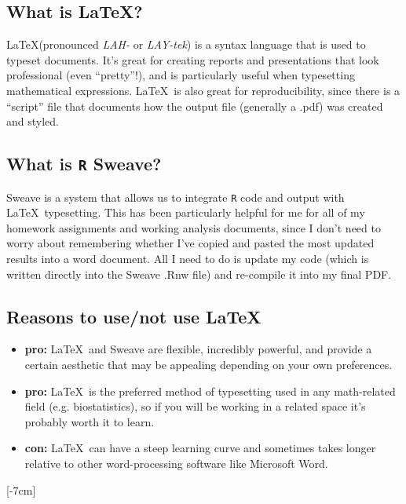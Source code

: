 \documentclass[11pt]{article}\usepackage[]{graphicx}\usepackage[]{color}
\begin{document}
\subsection{What is \LaTeX?}

\LaTeX (pronounced \textit{LAH-} or \textit{LAY-tek}) is a syntax language that is used to typeset documents. It's great for creating reports and presentations that look professional (even ``pretty''!), and is particularly useful when typesetting mathematical expressions. \LaTeX\ is also great for reproducibility, since there is a ``script'' file that documents how the output file (generally a .pdf) was created and styled. 

\subsection{What is \texttt{R} Sweave?}

Sweave is a system that allows us to integrate \texttt{R} code and output with \LaTeX\ typesetting. This has been particularly helpful for me for all of my homework assignments and working analysis documents, since I don't need to worry about remembering whether I've copied and pasted the most updated results into a word document. All I need to do is update my code (which is written directly into the Sweave .Rnw file) and re-compile it into my final PDF. 

\subsection{Reasons to use/not use \LaTeX\ }

\begin{itemize}
  \item \textbf{pro: }\LaTeX\ and Sweave are flexible, incredibly powerful, and provide a certain aesthetic that may be appealing depending on your own preferences. 
  \item \textbf{pro: }\LaTeX\ is the preferred method of typesetting used in any math-related field (e.g. biostatistics), so if you will be working in a related space it's probably worth it to learn.
  \item \textbf{con: }\LaTeX\ can have a steep learning curve and sometimes takes longer relative to other word-processing software like Microsoft Word. 
\end{itemize}

[-7cm]
\end{document}
